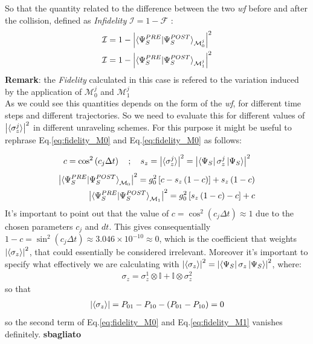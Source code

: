 \documentclass[a4paper,12pt]{article}
\begin{document}
So that the quantity related to the difference between the two \textit{wf} before and after the collision, defined as \textit{Infidelity} $ \mathcal{I} = 1 - \mathcal{F} $ :
\begin{align}
	\mathcal{I} = 1 - \left| \braket{\Psi_{S}^{PRE} | \Psi_{S}^{POST}}_{\mathcal{M}_{0}^{j}} \right|^2 \\
	\mathcal{I} = 1 - \left| \braket{\Psi_{S}^{PRE} | \Psi_{S}^{POST}}_{\mathcal{M}_{1}^{j}} \right|^2
\end{align}
\textbf{Remark}: the \textit{Fidelity} calculated in this case is refered to the variation induced by the application of $ \mathcal{M}_{0}^{j} $ and $ \mathcal{M}_{1}^{j} $ \\

As we could see this quantities depends on the form of the \textit{wf}, for different time steps and different trajectories.
So we need to evaluate this for different values of $ \left| \braket{\sigma_{z}^{j}} \right|^2 $ in different unraveling schemes. For this purpose it might be useful to rephrase Eq.\ref{eq:fidelity_M0} and Eq.\ref{eq:fidelity_M0} as follows:

\begin{equation}
	c = \cos^{2} \left( c_{j} \Delta t \right) \quad ; \quad s_{z} = \left| \braket{\sigma_{z}^{j}} \right|^2 = \left| \bra{\Psi_{S}} \sigma_{z}^{j}\ket{\Psi_{S}} \right|^2
\end{equation}
\begin{align}
	\left| \braket{\Psi_{S}^{PRE} | \Psi_{S}^{POST}}_{\mathcal{M}_{0}} \right|^2 = g_{0}^{2} \left[ c - s_{z} \left(1 - c \right) \right] + s_{z} \left(1 - c \right) \label{eq:fidelity_M0_ref} \\
	\left| \braket{\Psi_{S}^{PRE} | \Psi_{S}^{POST}}_{\mathcal{M}_{1}} \right|^2 = g_{0}^{2} \left[ s_{z} \left(1 - c \right) - c \right] + c \label{eq:fidelity_M1_ref}
\end{align}
It's important to point out that the value of $ c = \cos^{2} \left( c_{j} \Delta t \right) \approx 1 $ due to the chosen parameters $ c_j $ and $ dt $. This gives consequentially $ 1 - c = \sin^{2} \left( c_{j} \Delta t \right) \approx 3.046 \times 10^{-10} \approx 0 $, which is the coefficient that weights $ \left| \braket{\sigma_{z}} \right|^2 $, that could essentially be considered irrelevant.
Moreover it's important to specify what effectively we are calculating with $ \left| \braket{\sigma_{z}} \right|^2 = \left| \bra{\Psi_{S}} \sigma_{z} \ket{\Psi_{S}} \right|^2 $, where:
\begin{gather}
	\sigma_{z} = \sigma_{z}^{1} \otimes \mathbb{I} + \mathbb{I} \otimes \sigma_{z}^{2}
\end{gather}
so that
\begin{align}
	\left| \braket{\sigma_{z}} \right| = P_{01} - P_{10} - \left( P_{01} - P_{10} \right) = 0
\end{align}
so the second term of Eq.\ref{eq:fidelity_M0} and Eq.\ref{eq:fidelity_M1} vanishes definitely. \textbf{sbagliato}
\end{document}

